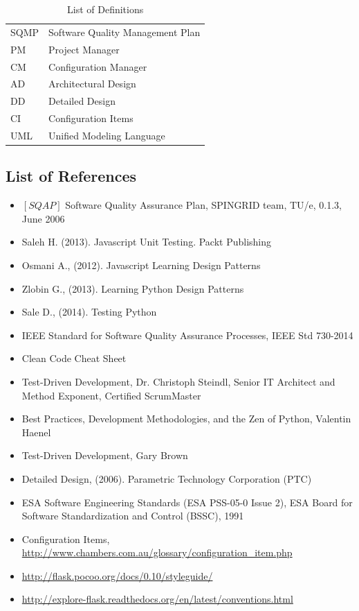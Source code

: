 \documentclass{report}
\begin{document}
\begin{table}[ht]
\begin{adjustbox}{width=1\textwidth,center=\textwidth}
\begin{tabular}{| l | l |}
SQMP 			& Software Quality Management Plan \\
PM 				& Project Manager \\
CM 				& Configuration Manager \\
AD 				& Architectural Design \\
DD 				& Detailed Design \\ 
CI 				& Configuration Items \\
UML 				& Unified Modeling Language \\
\hline
\end{tabular}
\end{adjustbox}
\caption{List of Definitions} 
\end{table}

\newpage

\subsection{List of References}
\begin{itemize}
\item $[SQAP]$ Software Quality Assurance Plan, SPINGRID team, TU/e, 0.1.3, June 2006
\item Saleh H. (2013). Javascript Unit Testing.  Packt Publishing
\item Osmani A., (2012). Javascript Learning Design Patterns
\item Zlobin G., (2013). Learning Python Design Patterns
\item Sale D., (2014). Testing Python
\item IEEE Standard for Software Quality Assurance Processes, IEEE Std 730-2014
\item Clean Code Cheat Sheet
\item Test-Driven Development, Dr. Christoph Steindl, Senior IT Architect and Method Exponent, Certified ScrumMaster
\item Best Practices, Development Methodologies, and the Zen of Python, Valentin Haenel
\item Test-Driven Development, Gary Brown
\item Detailed Design, (2006). Parametric Technology Corporation (PTC)
\item ESA Software Engineering Standards (ESA PSS-05-0 Issue 2), ESA Board for Software Standardization and Control (BSSC), 1991
\item Configuration Items, \url {http://www.chambers.com.au/glossary/configuration_item.php}
\item \url {http://flask.pocoo.org/docs/0.10/styleguide/}
\item \url {http://explore-flask.readthedocs.org/en/latest/conventions.html}
\end{itemize}
\end{document}
